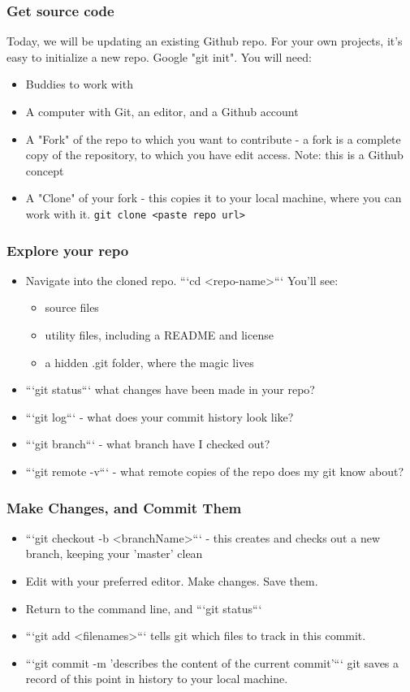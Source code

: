 \documentclass[unknownkeysallowed]{beamer}
\begin{document}
\begin{frame}[fragile]
    \frametitle{Get source code}
Today, we will be updating an existing Github repo. For your own projects, it's easy to initialize a new repo. Google "git init".
You will need:
    \begin{itemize}
        \item{Buddies to work with}
        \item{A computer with Git, an editor, and a Github account}
        \item{A "Fork" of the repo to which you want to contribute - a fork is a complete copy of the repository, to which you have edit access. Note: this is a Github concept}
        \item{A "Clone" of your fork - this copies it to your local machine, where you can work with it.  \verb/git clone <paste repo url>/}
    \end{itemize}
\end{frame}

\begin{frame}
    \frametitle{Explore your repo}
    \begin{itemize}
        \item{Navigate into the cloned repo. ```cd <repo-name>``` You'll see:}
            \begin{itemize}
              \item{source files}
              \item{utility files, including a README and license}
              \item{a hidden .git folder, where the magic lives}
            \end{itemize}
        \item{```git status``` what changes have been made in your repo?}
        \item{```git log``` - what does your commit history look like?}
        \item{```git branch``` - what branch have I checked out?}
        \item{```git remote -v``` - what remote copies of the repo does my git know about?}
    \end{itemize}
\end{frame}

\begin{frame}
    \frametitle{Make Changes, and Commit Them}
    \begin{itemize}
        \item{```git checkout -b <branchName>``` - this creates and checks out a new branch, keeping your 'master' clean}
        \item{Edit with your preferred editor. Make changes. Save them.}
        \item{Return to the command line, and ```git status```}
        \item{```git add <filenames>``` tells git which files to track in this commit.}
        \item{```git commit -m 'describes the content of the current commit'``` git saves a record of this point in history to your local machine.}
    \end{itemize}
\end{frame}
\end{document}
